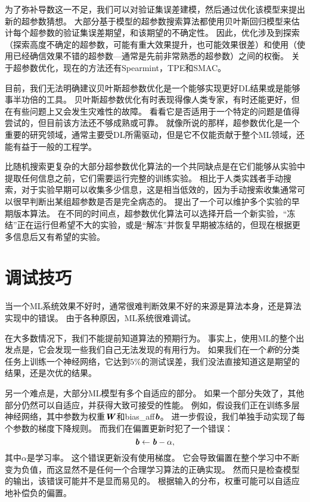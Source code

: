 为了弥补导数这一不足，我们可以对验证集误差建模，然后通过优化该模型来提出新的超参数猜想。
大部分基于模型的超参数搜索算法都使用贝叶斯回归模型来估计每个超参数的验证集误差期望，和该期望的不确定性。
因此，优化涉及到探索（探索高度不确定的超参数，可能有重大效果提升，也可能效果很差）和使用（使用已经确信效果不错的超参数---通常是先前非常熟悉的超参数）之间的权衡。
关于超参数优化，现在的方法还有Spearmint\citep{Snoek+al-NIPS2012-small}，TPE\citep{Bergstra+al-NIPS2011}和SMAC\citep{hutter+hoos+leyton+brown:2011}。

目前，我们无法明确建议贝叶斯超参数优化是一个能够实现更好\gls{DL}结果或是能够事半功倍的工具。
贝叶斯超参数优化有时表现得像人类专家，有时还能更好，但在有些问题上又会发生灾难性的故障。
看看它是否适用于一个特定的问题是值得尝试的，但目前该方法还不够成熟或可靠。
就像所说的那样，超参数优化是一个重要的研究领域，通常主要受\gls{DL}所需驱动，但是它不仅能贡献于整个\gls{ML}领域，还能有益于一般的工程学。


比随机搜索更复杂的大部分超参数优化算法的一个共同缺点是在它们能够从实验中提取任何信息之前，它们需要运行完整的训练实验。
相比于人类实践者手动搜索，对于实验早期可以收集多少信息，这是相当低效的，因为手动搜索收集通常可以很早判断出某组超参数是否是完全病态的。
\cite{swersky2014freeze}提出了一个可以维护多个实验的早期版本算法。
在不同的时间点，超参数优化算法可以选择开启一个新实验，“冻结”正在运行但希望不大的实验，或是“解冻”并恢复早期被冻结的，但现在根据更多信息后又有希望的实验。

\section{调试技巧}
\label{sec:debugging_strategies}
当一个\gls{ML}系统效果不好时，通常很难判断效果不好的来源是算法本身，还是算法实现中的错误。
由于各种原因，\gls{ML}系统很难调试。

在大多数情况下，我们不能提前知道算法的预期行为。
事实上，使用\gls{ML}的整个出发点是，它会发现一些我们自己无法发现的有用行为。
如果我们在一个\emph{新}的分类任务上训练一个神经网络，它达到$5\%$的测试误差，我们没法直接知道这是期望的结果，还是次优的结果。

另一个难点是，大部分\gls{ML}模型有多个自适应的部分。
如果一个部分失效了，其他部分仍然可以自适应，并获得大致可接受的性能。
例如，假设我们正在训练多层神经网络，其中参数为权重$\boldsymbol{\mathit{W}}$和\gls{bias_aff}$\boldsymbol{\mathit{b}}$。
进一步假设，我们单独手动实现了每个参数的梯度下降规则。
而我们在偏置更新时犯了一个错误：
\begin{equation}
	\boldsymbol{\mathit{b}} \leftarrow \boldsymbol{\mathit{b}} - \alpha,
\end{equation}
其中$\alpha$是学习率。
这个错误更新没有使用梯度。
它会导致偏置在整个学习中不断变为负值，而这显然不是任何一个合理学习算法的正确实现。
然而只是检查模型的输出，该错误可能并不是显而易见的。
根据输入的分布，权重可能可以自适应地补偿负的偏置。

